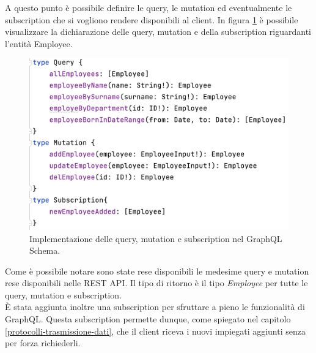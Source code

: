 A questo punto è possibile definire le query, le mutation ed eventualmente le subscription che si vogliono rendere disponibili al client. In figura \ref{query-employee} è possibile visualizzare la dichiarazione delle query, mutation e della subscription riguardanti l'entità Employee.
\FloatBarrier
\begin{figure}[!ht]
\centering
\includegraphics[width=0.6\linewidth]{immagini/queryEmployee.png}
\caption{Implementazione delle query, mutation e subscription nel GraphQL Schema.}
\label{query-employee}
\end{figure}
\FloatBarrier
Come è possibile notare sono state rese disponibili le medesime query e mutation rese disponibili nelle REST API. Il tipo di ritorno è il tipo \textit{Employee} per tutte le query, mutation e subscription.\\
È stata aggiunta inoltre una subscription per sfruttare a pieno le funzionalità di GraphQL. Questa subscription permette dunque, come spiegato nel capitolo \ref{protocolli-trasmissione-dati}, che il client riceva i nuovi impiegati aggiunti senza per forza richiederli.\\

